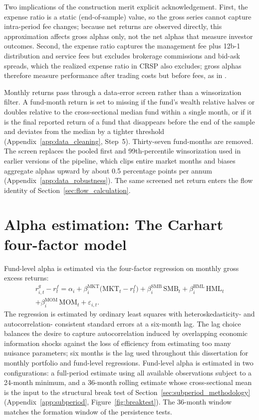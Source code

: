 \documentclass[12pt, oneside]{report}
\begin{document}
Two implications of the construction merit explicit acknowledgement.
First, the expense ratio is a static (end-of-sample) value, so the gross
series cannot capture intra-period fee changes; because net returns are
observed directly, this approximation affects gross alphas only, not the
net alphas that measure investor outcomes. Second, the expense ratio
captures the management fee plus 12b-1 distribution and service fees but
excludes brokerage commissions and bid-ask spreads, which the realized
expense ratio in CRSP also excludes; gross alphas therefore measure
performance after trading costs but before fees, as in
\textcite{FamaFrench2010}.

Monthly returns pass through a data-error screen rather than a
winsorization filter. A fund-month return is set to missing if the fund's
wealth relative halves or doubles relative to the cross-sectional median
fund within a single month, or if it is the final reported return of a
fund that disappears before the end of the sample and deviates from the
median by a tighter threshold (Appendix~\ref{app:data_cleaning}, Step~5).
Thirty-seven fund-months are removed. The screen replaces the pooled
first and 99th-percentile winsorization used in earlier versions of the
pipeline, which clips entire market months and biases aggregate alphas
upward by about 0.5 percentage points per annum
(Appendix~\ref{app:data_robustness}). The same screened net return enters
the flow identity of Section~\ref{sec:flow_calculation}.

\section{Alpha estimation: The Carhart four-factor model}
\label{sec:alpha_estimation}

\noindent Fund-level alpha is estimated via the \textcite{Carhart1997}
four-factor regression on monthly gross excess returns:
\begin{multline}
r^g_{i,t} - r^f_t = \alpha_i + \beta^{\text{MKT}}_i \bigl(\text{MKT}_t - r^f_t\bigr)
+ \beta^{\text{SMB}}_i \, \text{SMB}_t + \beta^{\text{HML}}_i \, \text{HML}_t \\
+ \beta^{\text{MOM}}_i \, \text{MOM}_t + \varepsilon_{i,t}.
\label{eq:carhart}
\end{multline}
The regression is estimated by ordinary least squares with
\textcite{NeweyWest1987} heteroskedasticity- and autocorrelation-
consistent standard errors at a six-month lag. The lag choice balances
the desire to capture autocorrelation induced by overlapping economic
information shocks against the loss of efficiency from estimating too
many nuisance parameters; six months is the lag used throughout this
dissertation for monthly portfolio and fund-level regressions. Fund-level alpha is
estimated in two configurations: a full-period estimate using all
available observations subject to a 24-month minimum, and a 36-month
rolling estimate whose cross-sectional mean is the input to the
structural break test of Section~\ref{sec:subperiod_methodology}
(Appendix~\ref{app:subperiod}, Figure~\ref{fig:breaktest}). The
36-month window matches the formation window of the persistence tests.
\end{document}
